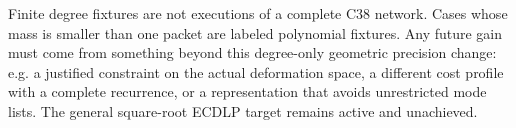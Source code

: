 \documentclass[11pt]{article}
\begin{document}
Finite degree fixtures are not executions of a complete C38 network.
Cases whose mass is smaller than one packet are labeled polynomial
fixtures. Any future gain must come from something beyond this
degree-only geometric precision change: e.g. a justified constraint on
the actual deformation space, a different cost profile with a complete
recurrence, or a representation that avoids unrestricted mode lists.
The general square-root ECDLP target remains active and unachieved.
\end{document}
